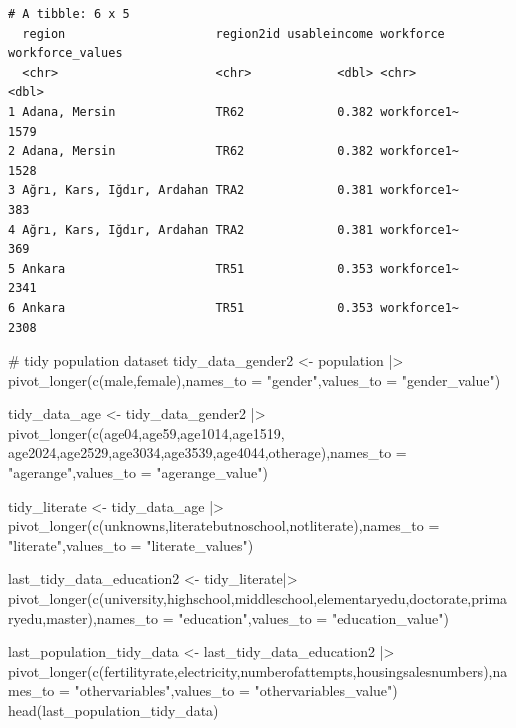 \documentclass[
  11pt,
  a4paper,
  DIV=11,
  numbers=noendperiod]{scrartcl}
\newenvironment{Shaded}{\begin{snugshade}}{\end{snugshade}}
\newcommand{\AttributeTok}[1]{\textcolor[rgb]{0.40,0.45,0.13}{#1}}
\newcommand{\CommentTok}[1]{\textcolor[rgb]{0.37,0.37,0.37}{#1}}
\newcommand{\FunctionTok}[1]{\textcolor[rgb]{0.28,0.35,0.67}{#1}}
\newcommand{\NormalTok}[1]{\textcolor[rgb]{0.00,0.23,0.31}{#1}}
\newcommand{\OtherTok}[1]{\textcolor[rgb]{0.00,0.23,0.31}{#1}}
\newcommand{\SpecialCharTok}[1]{\textcolor[rgb]{0.37,0.37,0.37}{#1}}
\newcommand{\StringTok}[1]{\textcolor[rgb]{0.13,0.47,0.30}{#1}}
\begin{document}
\begin{verbatim}
# A tibble: 6 x 5
  region                     region2id usableincome workforce   workforce_values
  <chr>                      <chr>            <dbl> <chr>                  <dbl>
1 Adana, Mersin              TR62             0.382 workforce1~             1579
2 Adana, Mersin              TR62             0.382 workforce1~             1528
3 Ağrı, Kars, Iğdır, Ardahan TRA2             0.381 workforce1~              383
4 Ağrı, Kars, Iğdır, Ardahan TRA2             0.381 workforce1~              369
5 Ankara                     TR51             0.353 workforce1~             2341
6 Ankara                     TR51             0.353 workforce1~             2308
\end{verbatim}

\begin{Shaded}
\begin{Highlighting}[]
\CommentTok{\# tidy population dataset}
\NormalTok{tidy\_data\_gender2 }\OtherTok{\textless{}{-}}\NormalTok{ population }\SpecialCharTok{|\textgreater{}} \FunctionTok{pivot\_longer}\NormalTok{(}\FunctionTok{c}\NormalTok{(male,female),}\AttributeTok{names\_to =} \StringTok{"gender"}\NormalTok{,}\AttributeTok{values\_to =} \StringTok{"gender\_value"}\NormalTok{) }

\NormalTok{tidy\_data\_age }\OtherTok{\textless{}{-}}\NormalTok{ tidy\_data\_gender2 }\SpecialCharTok{|\textgreater{}} \FunctionTok{pivot\_longer}\NormalTok{(}\FunctionTok{c}\NormalTok{(age04,age59,age1014,age1519,}
\NormalTok{                                                    age2024,age2529,age3034,age3539,age4044,otherage),}\AttributeTok{names\_to =} \StringTok{"agerange"}\NormalTok{,}\AttributeTok{values\_to =} \StringTok{"agerange\_value"}\NormalTok{)}

\NormalTok{tidy\_literate }\OtherTok{\textless{}{-}}\NormalTok{ tidy\_data\_age }\SpecialCharTok{|\textgreater{}} \FunctionTok{pivot\_longer}\NormalTok{(}\FunctionTok{c}\NormalTok{(unknowns,literatebutnoschool,notliterate),}\AttributeTok{names\_to =} \StringTok{"literate"}\NormalTok{,}\AttributeTok{values\_to =} \StringTok{"literate\_values"}\NormalTok{)}

\NormalTok{last\_tidy\_data\_education2 }\OtherTok{\textless{}{-}}\NormalTok{ tidy\_literate}\SpecialCharTok{|\textgreater{}} \FunctionTok{pivot\_longer}\NormalTok{(}\FunctionTok{c}\NormalTok{(university,highschool,middleschool,elementaryedu,doctorate,primaryedu,master),}\AttributeTok{names\_to =} \StringTok{"education"}\NormalTok{,}\AttributeTok{values\_to =} \StringTok{"education\_value"}\NormalTok{)}

\NormalTok{last\_population\_tidy\_data }\OtherTok{\textless{}{-}}\NormalTok{ last\_tidy\_data\_education2 }\SpecialCharTok{|\textgreater{}} \FunctionTok{pivot\_longer}\NormalTok{(}\FunctionTok{c}\NormalTok{(fertilityrate,electricity,numberofattempts,housingsalesnumbers),}\AttributeTok{names\_to =} \StringTok{"othervariables"}\NormalTok{,}\AttributeTok{values\_to =} \StringTok{"othervariables\_value"}\NormalTok{)}
\FunctionTok{head}\NormalTok{(last\_population\_tidy\_data)}
\end{Highlighting}
\end{Shaded}
\end{document}
